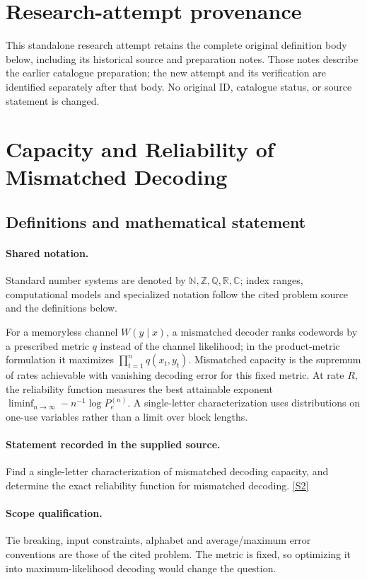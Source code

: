 \documentclass[11pt]{article}
\begin{document}
\section*{Research-attempt provenance}
This standalone research attempt retains the complete original definition body below,
including its historical source and preparation notes. Those notes describe the
earlier catalogue preparation; the new attempt and its verification are identified
separately after that body. No original ID, catalogue status, or source statement is changed.

\section{Capacity and Reliability of Mismatched Decoding}\label{statement}

\subsection{Definitions and mathematical statement}

\paragraph{Shared notation.}Standard number systems are denoted by $\mathbb N,\mathbb Z,\mathbb Q,\mathbb R,\mathbb C$; index ranges, computational models and specialized notation follow the cited problem source and the definitions below.


For a memoryless channel $W(y\mid x)$, a mismatched decoder ranks codewords by a prescribed metric $q$ instead of the channel likelihood; in the product-metric formulation it maximizes $\prod_{t=1}^n q(x_t,y_t)$. Mismatched capacity is the supremum of rates achievable with vanishing decoding error for this fixed metric. At rate $R$, the reliability function measures the best attainable exponent $\liminf_{n\to\infty}-n^{-1}\log P_e^{(n)}$. A single-letter characterization uses distributions on one-use variables rather than a limit over block lengths.
\paragraph{Statement recorded in the supplied source.}
Find a single-letter characterization of mismatched decoding capacity, and determine the exact reliability function for mismatched decoding. \href{https://doi.org/10.4171/owr/2022/14}{[S2]}
\paragraph{Scope qualification.}
Tie breaking, input constraints, alphabet and average/maximum error conventions are those of the cited problem. The metric is fixed, so optimizing it into maximum-likelihood decoding would change the question.
\end{document}
